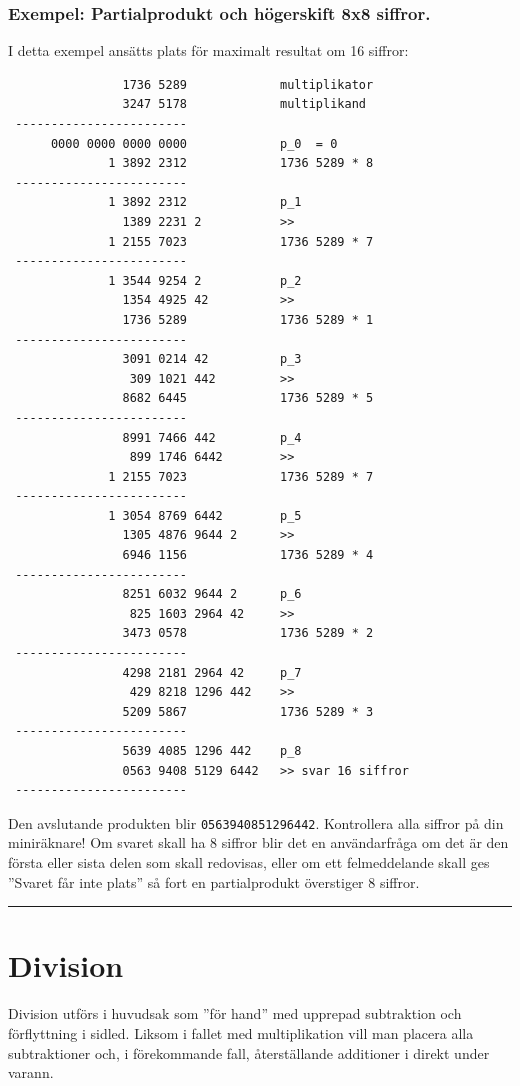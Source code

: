 \documentclass[oneside,10pt,a4paper,swedish]{scrbook}
\newcommand{\startex}[1]{\subsubsection{Exempel: #1}}
\newcommand{\slutex}{\vspace{-8mm}\begin{flushright} \rule{1ex}{1ex} \end{flushright}}
\newcommand{\asm}[1]{\texttt{#1}}
\begin{document}
\startex{Partialprodukt och högerskift 8x8 siffror.}
I detta exempel ansätts plats för maximalt resultat om 16 siffror:
\begin{center}
\begin{lstlisting}
                1736 5289             multiplikator
                3247 5178             multiplikand
 ------------------------
      0000 0000 0000 0000             p_0  = 0
              1 3892 2312             1736 5289 * 8
 ------------------------
              1 3892 2312             p_1
                1389 2231 2           >>
              1 2155 7023             1736 5289 * 7
 ------------------------
              1 3544 9254 2           p_2
                1354 4925 42          >>
                1736 5289             1736 5289 * 1
 ------------------------   
                3091 0214 42          p_3
                 309 1021 442         >>
                8682 6445             1736 5289 * 5
 ------------------------  
                8991 7466 442         p_4
                 899 1746 6442        >>
              1 2155 7023             1736 5289 * 7
 ------------------------  
              1 3054 8769 6442        p_5
                1305 4876 9644 2      >>
                6946 1156             1736 5289 * 4
 ------------------------  
                8251 6032 9644 2      p_6
               	 825 1603 2964 42     >>
                3473 0578             1736 5289 * 2
 ------------------------  
                4298 2181 2964 42     p_7
                 429 8218 1296 442    >>
                5209 5867             1736 5289 * 3
 ------------------------  
                5639 4085 1296 442    p_8             
                0563 9408 5129 6442   >> svar 16 siffror
 ------------------------  
\end{lstlisting}
\end{center}

Den avslutande produkten blir \asm{0563940851296442}. Kontrollera alla siffror på din miniräknare! Om svaret skall ha 8 siffror blir det en användarfråga om det är den första eller sista delen som skall redovisas, eller om ett felmeddelande skall ges ''Svaret får inte plats'' så fort en partialprodukt överstiger 8 siffror.

\slutex


\section{Division}

Division utförs i huvudsak som ''för hand'' med upprepad subtraktion och förflyttning i sidled. Liksom i fallet med multiplikation vill man placera alla subtraktioner och, i förekommande fall, återställande additioner i direkt under varann. 
\end{document}
